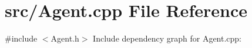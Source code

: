 \section{src/\+Agent.cpp File Reference}
\label{_agent_8cpp}
{\ttfamily \#include $<$Agent.\+h$>$}\newline
Include dependency graph for Agent.\+cpp\+:
